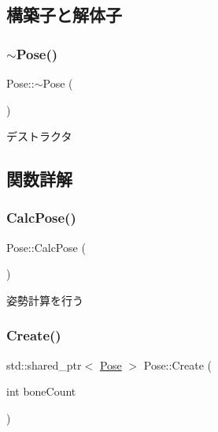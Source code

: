 \subsection{構築子と解体子}
\mbox{\label{class_pose_a4267a4b362912dded8377f2c3260803e}} 
\subsubsection{\texorpdfstring{$\sim$\+Pose()}{~Pose()}}
{\footnotesize\ttfamily Pose\+::$\sim$\+Pose (\begin{DoxyParamCaption}{ }\end{DoxyParamCaption})}



デストラクタ 



\subsection{関数詳解}
\mbox{\label{class_pose_a95523df0d97161fcf06258fa3dd556c7}} 
\subsubsection{\texorpdfstring{Calc\+Pose()}{CalcPose()}}
{\footnotesize\ttfamily Pose\+::\+Calc\+Pose (\begin{DoxyParamCaption}{ }\end{DoxyParamCaption})}

姿勢計算を行う \mbox{\label{class_pose_a47091fb8b00829db53ec72d7f35a1cad}} 
\subsubsection{\texorpdfstring{Create()}{Create()}\hspace{0.1cm}{\footnotesize\ttfamily [1/2]}}
{\footnotesize\ttfamily std\+::shared\+\_\+ptr$<$ \mbox{\hyperlink{class_pose}{Pose}} $>$ Pose\+::\+Create (\begin{DoxyParamCaption}\item[{int}]{bone\+Count }\end{DoxyParamCaption})\hspace{0.3cm}{\ttfamily [static]}}


